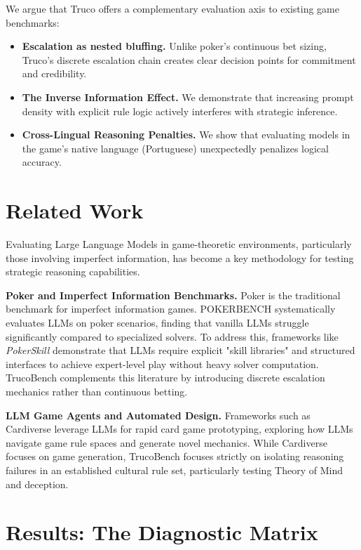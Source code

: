 \documentclass[11pt]{article}
\begin{document}
We argue that Truco offers a complementary evaluation axis to existing game benchmarks:
\begin{itemize}
    \item \textbf{Escalation as nested bluffing.} Unlike poker's continuous bet sizing, Truco's discrete escalation chain creates clear decision points for commitment and credibility.
    \item \textbf{The Inverse Information Effect.} We demonstrate that increasing prompt density with explicit rule logic actively interferes with strategic inference.
    \item \textbf{Cross-Lingual Reasoning Penalties.} We show that evaluating models in the game's native language (Portuguese) unexpectedly penalizes logical accuracy.
\end{itemize}

\section{Related Work}
Evaluating Large Language Models in game-theoretic environments, particularly those involving imperfect information, has become a key methodology for testing strategic reasoning capabilities. 

\textbf{Poker and Imperfect Information Benchmarks.} Poker is the traditional benchmark for imperfect information games. POKERBENCH \cite{xu2024pokerbench} systematically evaluates LLMs on poker scenarios, finding that vanilla LLMs struggle significantly compared to specialized solvers. To address this, frameworks like \textit{PokerSkill} \cite{pokerskill} demonstrate that LLMs require explicit "skill libraries" and structured interfaces to achieve expert-level play without heavy solver computation. TrucoBench complements this literature by introducing discrete escalation mechanics rather than continuous betting.

\textbf{LLM Game Agents and Automated Design.} Frameworks such as Cardiverse \cite{cardiverse} leverage LLMs for rapid card game prototyping, exploring how LLMs navigate game rule spaces and generate novel mechanics. While Cardiverse focuses on game generation, TrucoBench focuses strictly on isolating reasoning failures in an established cultural rule set, particularly testing Theory of Mind and deception.

\section{Results: The Diagnostic Matrix}
\end{document}
